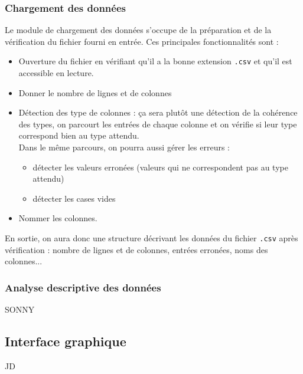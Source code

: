 			\subsubsection{Chargement des données}
				Le module de chargement des données s'occupe de la préparation et de la vérification du fichier fourni en entrée. Ces principales fonctionnalités sont :
				\begin{itemize}
				\item Ouverture du fichier en vérifiant qu'il a la bonne extension \lstinline!.csv! et qu'il est accessible en lecture.
				\item Donner le nombre de lignes et de colonnes
				\item Détection des type de colonnes : ça sera plutôt une détection de la cohérence des types, on parcourt les entrées de chaque colonne et on vérifie si leur type correspond bien au type attendu.\\
				Dans le même parcours, on pourra aussi gérer les erreurs :
					\begin{itemize}
					\item détecter les valeurs erronées (valeurs qui ne correspondent pas au type attendu)
					\item détecter les cases vides
					\end{itemize}
				\item Nommer les colonnes.
				\end{itemize}
				En sortie, on aura donc une structure décrivant les données du fichier \lstinline!.csv! après vérification : nombre de lignes et de colonnes, entrées erronées, noms des colonnes...
				
			\subsubsection{Analyse descriptive des données}
				SONNY
			
		\subsection{Interface graphique}
			JD
		
		
	

